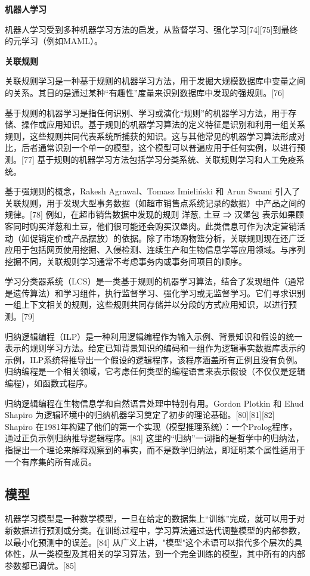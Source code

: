 \textbf{机器人学习}

机器人学习受到多种机器学习方法的启发，从监督学习、强化学习[74][75]到最终的元学习（例如MAML）。

\textbf{关联规则}

关联规则学习是一种基于规则的机器学习方法，用于发掘大规模数据库中变量之间的关系。其目的是通过某种“有趣性”度量来识别数据库中发现的强规则。[76]

基于规则的机器学习是指任何识别、学习或演化“规则”的机器学习方法，用于存储、操作或应用知识。基于规则的机器学习算法的定义特征是识别和利用一组关系规则，这些规则共同代表系统所捕获的知识。这与其他常见的机器学习算法形成对比，后者通常识别一个单一的模型，这个模型可以普遍应用于任何实例，以进行预测。[77] 基于规则的机器学习方法包括学习分类系统、关联规则学习和人工免疫系统。

基于强规则的概念，Rakesh Agrawal、Tomasz Imieliński 和 Arun Swami 引入了关联规则，用于发现大型事务数据（如超市销售点系统记录的数据）中产品之间的规律。[78] 例如，在超市销售数据中发现的规则 
{
洋葱,
土豆
}
⇒
{
汉堡包
}  
表示如果顾客同时购买洋葱和土豆，他们很可能还会购买汉堡肉。此类信息可作为决定营销活动（如促销定价或产品摆放）的依据。除了市场购物篮分析，关联规则现在还广泛应用于包括网页使用挖掘、入侵检测、连续生产和生物信息学等应用领域。与序列挖掘不同，关联规则学习通常不考虑事务内或事务间项目的顺序。

学习分类器系统（LCS）是一类基于规则的机器学习算法，结合了发现组件（通常是遗传算法）和学习组件，执行监督学习、强化学习或无监督学习。它们寻求识别一组上下文相关的规则，这些规则共同存储并以分段的方式应用知识，以进行预测。[79]

归纳逻辑编程（ILP）是一种利用逻辑编程作为输入示例、背景知识和假设的统一表示的规则学习方法。给定已知背景知识的编码和一组作为逻辑事实数据库表示的示例，ILP系统将推导出一个假设的逻辑程序，该程序涵盖所有正例且没有负例。归纳编程是一个相关领域，它考虑任何类型的编程语言来表示假设（不仅仅是逻辑编程），如函数式程序。

归纳逻辑编程在生物信息学和自然语言处理中特别有用。Gordon Plotkin 和 Ehud Shapiro 为逻辑环境中的归纳机器学习奠定了初步的理论基础。[80][81][82] Shapiro 在1981年构建了他们的第一个实现（模型推理系统）：一个Prolog程序，通过正负示例归纳推导逻辑程序。[83] 这里的“归纳”一词指的是哲学中的归纳法，指提出一个理论来解释观察到的事实，而不是数学归纳法，即证明某个属性适用于一个有序集的所有成员。
\subsection{模型}
机器学习模型是一种数学模型，一旦在给定的数据集上“训练”完成，就可以用于对新数据进行预测或分类。在训练过程中，学习算法通过迭代调整模型的内部参数，以最小化预测中的误差。[84] 从广义上讲，"模型"这个术语可以指代多个层次的具体性，从一类模型及其相关的学习算法，到一个完全训练的模型，其中所有的内部参数都已调优。[85]

